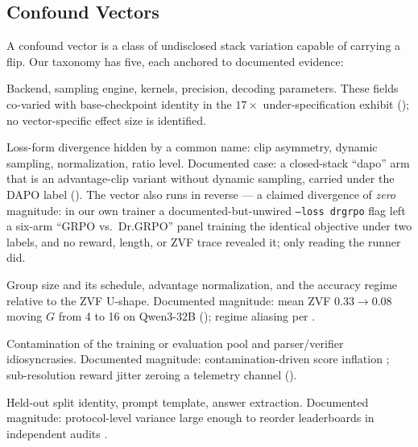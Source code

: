\subsection{Confound Vectors}
\label{sec:p5-vectors}
A confound vector is a class of undisclosed stack variation capable of
carrying a flip. Our taxonomy has five, each anchored to documented evidence:
\begin{description}[leftmargin=1.5em, itemsep=2pt, topsep=2pt]
\item[V1 --- Numerics and serving.] Backend, sampling engine, kernels,
precision, decoding parameters. These fields co-varied with base-checkpoint
identity in the $17\times$ under-specification exhibit
(); no vector-specific effect size is identified.
\item[V2 --- Objective semantics under a shared label.] Loss-form divergence
hidden by a common name: clip asymmetry, dynamic sampling, normalization,
ratio level. Documented case: a closed-stack ``dapo'' arm that is an
advantage-clip variant without dynamic sampling, carried under the DAPO label
(). The vector also runs in
reverse --- a claimed divergence of \emph{zero} magnitude: in our own
trainer a documented-but-unwired \texttt{--loss drgrpo} flag left a six-arm
``GRPO vs.\ Dr.GRPO'' panel training the identical objective under two
labels, and no reward, length, or ZVF trace revealed it; only reading the
runner did.
\item[V3 --- Signal geometry.] Group size and its schedule, advantage
normalization, and the accuracy regime relative to the ZVF U-shape.
Documented magnitude: mean ZVF $0.33 \to 0.08$ moving $G$ from 4 to 16 on
Qwen3-32B (); regime aliasing per
.
\item[V4 --- Environment and data.] Contamination of the training or
evaluation pool and parser/verifier idiosyncrasies. Documented magnitude:
contamination-driven score inflation \citep{zhang2024gsm1k,
riddell2024contamination}; sub-resolution reward jitter zeroing a telemetry
channel ().
\item[V5 --- Evaluation protocol.] Held-out split identity, prompt template,
answer extraction. Documented magnitude: protocol-level variance large enough
to reorder leaderboards in independent audits \citep{biderman2024lessons,
hochlehnert2025sober, zhang2024benchvariance}.
\end{description}

